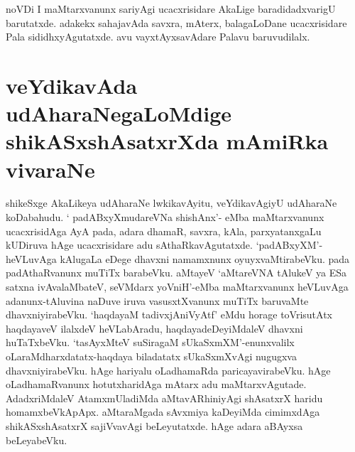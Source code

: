 noVDi I maMtarxvanunx sariyAgi ucacxrisidare AkaLige baradidadxvarigU barutatxde. adakekx sahajavAda savxra, mAterx, balagaLoDane ucacxrisidare Pala sididhxyAgutatxde. avu vayxtAyxsavAdare Palavu baruvudilalx.

\section*{veYdikavAda udAharaNegaLoMdige shikASxshAsatxrXda mAmiRka vivaraNe}

shikeSxge AkaLikeya udAharaNe lwkikavAyitu, veYdikavAgiyU udAharaNe koDabahudu. ` padABxyXmudareVNa shishAnx'-\label{26} eMba maMtarxvanunx ucacxrisidAga AyA pada, adara dhamaR, savxra, kAla, parxyatanxgaLu kUDiruva hAge ucacxrisidare adu sAthaRkavAgutatxde. `padABxyXM'-heVLuvAga kAlugaLa eDege dhavxni namamxnunx oyuyxvaMtirabeVku. pada padAthaRvanunx muTiTx barabeVku. aMtayeV `aMtareVNA tAlukeV ya ESa satxna ivAvalaMbateV, seVMdarx yoVniH'-eMba maMtarxvanunx heVLuvAga adanunx-tAluvina naDuve iruva vasusxtXvanunx muTiTx baruvaMte dhavxniyirabeVku. `haqdayaM tadivxjAniVyAtf'\label{27a} eMdu horage toVrisutAtx haqdayaveV ilalxdeV heVLabAradu, haqdayadeDeyiMdaleV dhavxni huTaTxbeVku. `tasAyxMteV suSiragaM sUkaSxmXM'-enunxvalilx\label{27} oLaraMdharxdatatx-haqdaya biladatatx sUkaSxmXvAgi nugugxva dhavxniyirabeVku. hAge hariyalu oLadhamaRda paricayavirabeVku. hAge oLadhamaRvanunx hotutxharidAga mAtarx adu maMtarxvAgutade. AdadxriMdaleV AtamxmUladiMda aMtavARhiniyAgi shAsatxrX haridu homamxbeVkApApx. aMtaraMgada sAvxmiya kaDeyiMda cimimxdAga shikASxshAsatxrX sajiVvavAgi beLeyutatxde. hAge adara aBAyxsa beLeyabeVku.




